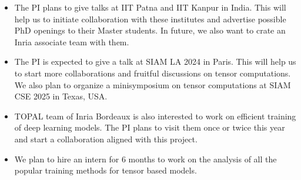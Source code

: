 \begin{itemize}
	\item The PI plans to give talks at IIT Patna and IIT Kanpur in India. This will help us to initiate collaboration with these institutes and advertise possible PhD openings to their Master students. In future, we also want to crate an Inria associate team with them.
	\item The PI is expected to give a talk at SIAM LA 2024 in Paris. This will help us to start more collaborations and fruitful discussions on tensor computations. We also plan to organize a minisymposium on tensor computations at SIAM CSE 2025 in Texas, USA.
	\item TOPAL team of Inria Bordeaux is also interested to work on efficient training of deep learning models. The PI plans to visit them once or twice this year and start a collaboration aligned with this project.
	\item We plan to hire an intern for $6$ months to work on the analysis of all the popular training methods for tensor based models.
\end{itemize} 


%




{\footnotesize }


